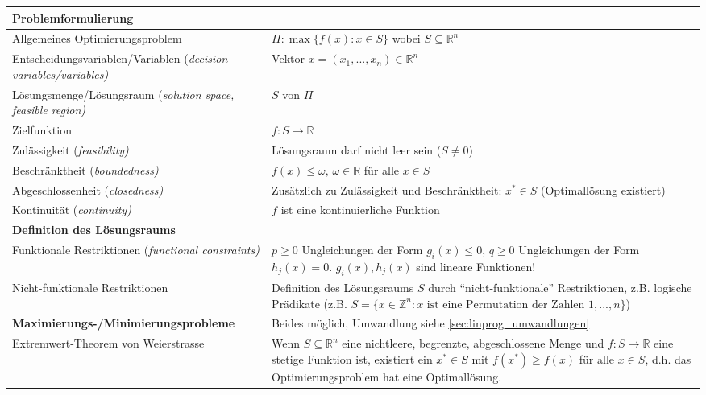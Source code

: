   \begin{tabularx}{\textwidth}{p{7cm} X}
  \hline
    \textbf{Problemformulierung} & \\
  \hline
    Allgemeines Optimierungsproblem
      & $\Pi: \max\{f(x) : x \in S\}$ wobei $S \subseteq \mathbb{R}^n$\\
    Entscheidungsvariablen/Variablen (\em decision variables/variables\em)
      & Vektor $x = (x_1, ..., x_n) \in \mathbb{R}^n$\\
    Lösungsmenge/Lösungsraum (\em solution space, feasible region\em)
      & $S$ von $\Pi$\\
    Zielfunktion
      & $f: S \rightarrow \mathbb{R}$\\
    Zulässigkeit (\em feasibility\em)
      & Lösungsraum darf nicht leer sein ($S \neq 0$)\\
    Beschränktheit (\em boundedness\em)
      & $f(x) \leq \omega,\, \omega \in \mathbb{R}$ für alle $x \in S$\\
    Abgeschlossenheit (\em closedness\em)
      & Zusätzlich zu Zulässigkeit und Beschränktheit: $x^* \in S$ (Optimallösung existiert)\\
    Kontinuität (\em continuity\em)
      & \(f\) ist eine kontinuierliche Funktion \\
  \hline
    \textbf{Definition des Lösungsraums} & \\
  \hline
    Funktionale Restriktionen (\em functional constraints\em)
      & $p\geq 0$ Ungleichungen der Form $g_i(x) \leq 0$, \newline
        $q \geq 0$ Ungleichungen der Form $h_j(x) = 0$.\newline
        $g_i(x), h_j(x)$ sind lineare Funktionen!\\
    Nicht-funktionale Restriktionen 
      & Definition des Lösungsraums $S$ durch "`nicht-funktionale"' Restriktionen, z.B. logische Prädikate (z.B. $S=\{x \in \mathbb{Z}^n: x \text{ ist eine Permutation der Zahlen } 1,...,n \}$) \\
  \hline
    \textbf{Maximierungs-/Minimierungsprobleme} & Beides möglich, Umwandlung siehe \ref{sec:linprog_umwandlungen}\\
  \hline
    Extremwert-Theorem von Weierstrasse
      & Wenn $S \subseteq \mathbb{R}^n$ eine nichtleere, begrenzte, abgeschlossene Menge und $f: S \rightarrow \mathbb{R}$ eine stetige Funktion ist, existiert ein $x^* \in S$ mit $f(x^*) \geq f(x)$
       für alle $x \in S$, d.h. das Optimierungsproblem hat eine Optimallösung.\\
  \hline

\end{tabularx}
